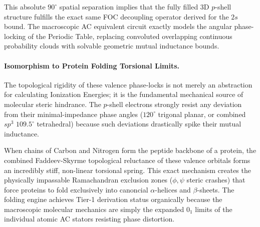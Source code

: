 This absolute $90^\circ$ spatial separation implies that the fully filled 3D $p$-shell structure fulfills the exact same FOC decoupling operator derived for the $2s$ bound. The macroscopic AC equivalent circuit exactly models the angular phase-locking of the Periodic Table, replacing convoluted overlapping continuous probability clouds with solvable geometric mutual inductance bounds.

\paragraph{Isomorphism to Protein Folding Torsional Limits.}
The topological rigidity of these valence phase-locks is not merely an abstraction for calculating Ionization Energies; it is the fundamental mechanical source of molecular steric hindrance. The $p$-shell electrons strongly resist any deviation from their minimal-impedance phase angles ($120^\circ$ trigonal planar, or combined $sp^3$ $109.5^\circ$ tetrahedral) because such deviations drastically spike their mutual inductance. 

When chains of Carbon and Nitrogen form the peptide backbone of a protein, the combined Faddeev-Skyrme topological reluctance of these valence orbitals forms an incredibly stiff, non-linear torsional spring. This exact mechanism creates the physically impassable Ramachandran exclusion zones ($\phi, \psi$ steric crashes) that force proteins to fold exclusively into canoncial $\alpha$-helices and $\beta$-sheets. The folding engine achieves Tier-1 derivation status organically because the macroscopic molecular mechanics are simply the expanded $0_1$ limits of the individual atomic AC stators resisting phase distortion.
